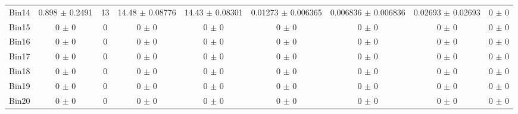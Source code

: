 \begin{tabular}{@{\extracolsep{4pt}}lcccccccc@{}}
     Bin14 & 0.898 $\pm$ 0.2491 & 13 & 14.48 $\pm$ 0.08776 & 14.43 $\pm$ 0.08301 & 0.01273 $\pm$ 0.006365 & 0.006836 $\pm$ 0.006836 & 0.02693 $\pm$ 0.02693 & 0 $\pm$ 0 \\ 
     Bin15 & 0 $\pm$ 0 & 0 & 0 $\pm$ 0 & 0 $\pm$ 0 & 0 $\pm$ 0 & 0 $\pm$ 0 & 0 $\pm$ 0 & 0 $\pm$ 0 \\ 
     Bin16 & 0 $\pm$ 0 & 0 & 0 $\pm$ 0 & 0 $\pm$ 0 & 0 $\pm$ 0 & 0 $\pm$ 0 & 0 $\pm$ 0 & 0 $\pm$ 0 \\ 
     Bin17 & 0 $\pm$ 0 & 0 & 0 $\pm$ 0 & 0 $\pm$ 0 & 0 $\pm$ 0 & 0 $\pm$ 0 & 0 $\pm$ 0 & 0 $\pm$ 0 \\ 
     Bin18 & 0 $\pm$ 0 & 0 & 0 $\pm$ 0 & 0 $\pm$ 0 & 0 $\pm$ 0 & 0 $\pm$ 0 & 0 $\pm$ 0 & 0 $\pm$ 0 \\ 
     Bin19 & 0 $\pm$ 0 & 0 & 0 $\pm$ 0 & 0 $\pm$ 0 & 0 $\pm$ 0 & 0 $\pm$ 0 & 0 $\pm$ 0 & 0 $\pm$ 0 \\ 
     Bin20 & 0 $\pm$ 0 & 0 & 0 $\pm$ 0 & 0 $\pm$ 0 & 0 $\pm$ 0 & 0 $\pm$ 0 & 0 $\pm$ 0 & 0 $\pm$ 0 \\ 
\hline\hline
  \end{tabular}
